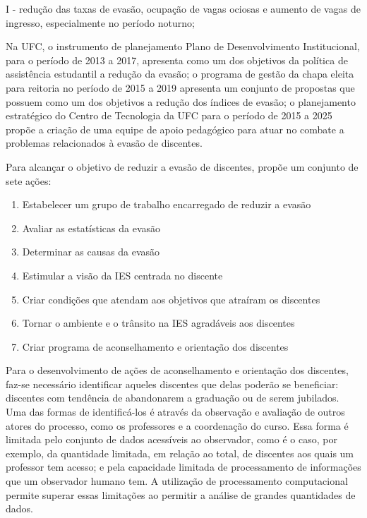 \begin{citacao}
I - redução das taxas de evasão, ocupação de vagas ociosas e aumento de vagas de ingresso, especialmente no período noturno;
\end{citacao}

Na UFC, o instrumento de planejamento Plano de Desenvolvimento Institucional\cite{pdi_ufc}, para o período de 2013 a 2017, apresenta como um dos objetivos da política de assistência estudantil a redução da evasão; o programa de gestão da chapa eleita para reitoria no período de 2015 a 2019\cite{henry} apresenta um conjunto de propostas que possuem como um dos objetivos a redução dos índices de evasão; o planejamento estratégico do Centro de Tecnologia da UFC para o período de 2015 a 2025 propõe a criação de uma equipe de apoio pedagógico para atuar no combate a problemas relacionados à evasão de discentes.


Para alcançar o objetivo de reduzir a evasão de discentes, \cite{evasao_panorama2} propõe um conjunto de sete ações:

\begin{enumerate}

\item Estabelecer um grupo de trabalho encarregado de reduzir a evasão
\item Avaliar as estatísticas da evasão
\item Determinar as causas da evasão
\item Estimular a visão da IES centrada no discente
\item Criar condições que atendam aos objetivos que atraíram os discentes
\item Tornar o ambiente e o trânsito na IES agradáveis aos discentes
\item Criar programa de aconselhamento e orientação dos discentes

\end{enumerate}

Para o desenvolvimento de ações de aconselhamento e orientação dos discentes, faz-se necessário identificar aqueles discentes que delas poderão se beneficiar: discentes com tendência de abandonarem a graduação ou de serem jubilados. Uma das formas de identificá-los é através da observação e avaliação de outros atores do processo, como os professores e a coordenação do curso. Essa forma é limitada pelo conjunto de dados acessíveis ao observador, como é o caso, por exemplo, da quantidade limitada, em relação ao total, de discentes aos quais um professor tem acesso; e pela capacidade limitada de processamento de informações que um observador humano tem. A utilização de processamento computacional permite superar essas limitações ao permitir a análise de grandes quantidades de dados.

